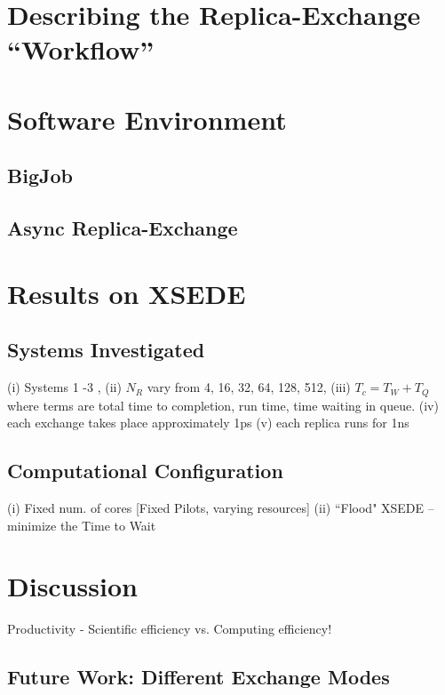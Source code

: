 \documentclass{sig-alternate}
\begin{document}
\section{Describing the Replica-Exchange ``Workflow'' } \label{}


\section{Software Environment}

\subsection{BigJob}

\subsection{Async Replica-Exchange}

\section{Results on XSEDE }\label{sec:results}

\subsection{Systems Investigated} 

(i) Systems 1 -3 , (ii) $N_R$ vary from 4, 16, 32, 64, 128, 512, (iii)
$T_c = T_W + T_Q$ where terms are total time to completion, run time,
time waiting in queue.  (iv) each exchange takes place approximately
1ps (v) each replica runs for 1ns


\subsection{Computational Configuration}
(i) Fixed num. of cores [Fixed Pilots, varying resources] (ii) ``Flood"
XSEDE -- minimize the Time to Wait

\section{Discussion}


Productivity - Scientific efficiency vs. Computing efficiency!


\subsection{Future Work: Different Exchange Modes}
\end{document}

